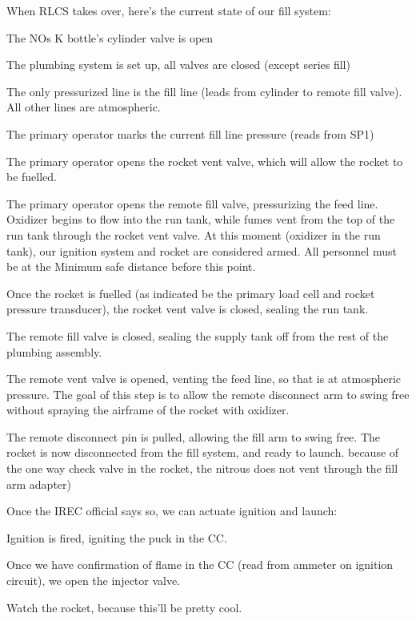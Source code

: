 \documentclass[letter]{article}
\begin{document}
\begin{checklist}
    \item When RLCS takes over, here's the current state of our fill system: 
    \begin{checklist}
        \item The NOs K bottle's cylinder valve is open 
        \item The plumbing system is set up, all valves are closed (except series
              fill)
        \item The only pressurized line is the fill line (leads from cylinder to
              remote fill valve). All other lines are atmospheric.
    \end{checklist}
    \item The primary operator marks the current fill line pressure (reads from SP1)
    \item The primary operator opens the rocket vent valve, which will allow the
            rocket to be fuelled.
    \item The primary operator opens the remote fill valve, pressurizing the feed
            line.  Oxidizer begins to flow into the run tank, while fumes vent from the
            top of the run tank through the rocket vent valve. At this moment (oxidizer in
            the run tank), our ignition system and rocket are considered armed. All
            personnel must be at the Minimum safe distance before this point.
    \item Once the rocket is fuelled (as indicated be the primary load cell and rocket
            pressure transducer), the rocket vent valve is closed, sealing the run tank.
    \item The remote fill valve is closed, sealing the supply tank off from the rest
            of the plumbing assembly.  
    \item The remote vent valve is opened, venting the feed line, so that is at
            atmospheric pressure. The goal of this step is to allow the remote
            disconnect arm to swing free without spraying the airframe of the rocket
            with oxidizer.
    \item The remote disconnect pin is pulled, allowing the fill arm to swing free.
            The rocket is now disconnected from the fill system, and ready to launch.
            because of the one way check valve in the rocket, the nitrous does not vent
            through the fill arm adapter)
    \item Once the IREC official says so, we can actuate ignition and launch:
    \begin{checklist}
        \item Ignition is fired, igniting the puck in the CC.
        \item Once we have confirmation of flame in the CC (read from ammeter on
                ignition circuit), we open the injector valve.
        \item Watch the rocket, because this'll be pretty cool.
    \end{checklist}
\end{checklist}
\end{document}

